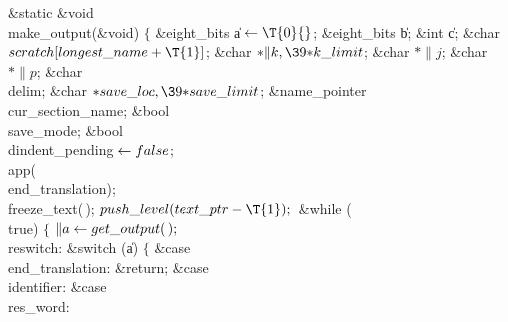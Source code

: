 \Y\B\1\1\&{static} \&{void} \\{make\_output}(\&{void})\2\2\6
${}\{{}$\1\6
\&{eight\_bits} \|a${}\K\T{0}{}$;\6
\&{eight\_bits} \|b;\6
\&{int} \|c;\6
\&{char} ${}\\{scratch}[\\{longest\_name}+\T{1}]{}$;\6
\&{char} ${}{*}\|k,\39{*}\\{k\_limit}{}$;\6
\&{char} ${}{*}\|j{}$;\6
\&{char} ${}{*}\|p{}$;\6
\&{char} \\{delim};\6
\&{char} ${}{*}\\{save\_loc},\39{*}\\{save\_limit}{}$;\6
\&{name\_pointer} \\{cur\_section\_name};\6
\&{bool} \\{save\_mode};\6
\&{bool} \\{dindent\_pending}${}\leftarrow\\{false}{}$;\7
\\{app}(\\{end\_translation});\6
\\{freeze\_text}(\,);\6
${}\\{push\_level}(\\{text\_ptr}-\T{1});{}$\6
\&{while} (\\{true})\5
${}\{{}$\1\6
${}\|a\leftarrow\\{get\_output}(\,);{}$\6
\4\\{reswitch}:\6
\&{switch} (\|a)\5
${}\{{}$\1\6
\4\&{case} \\{end\_translation}:\5
\&{return};\6
\4\&{case} \\{identifier}:\5
\&{case} \\{res\_word}:\5
